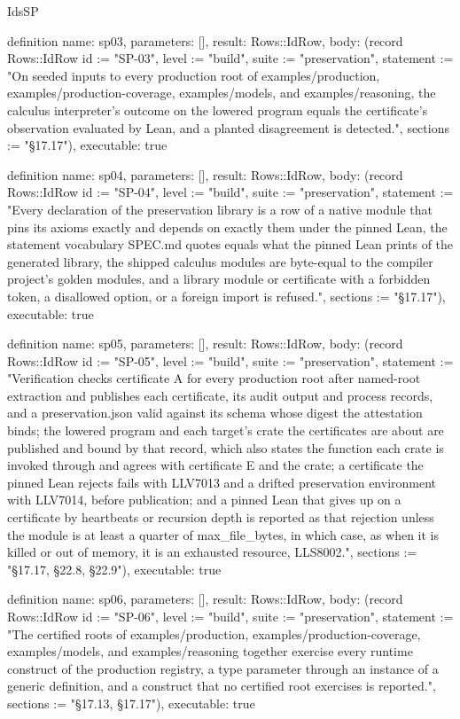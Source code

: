 \begin{lexlean}{IdsSP}
\begin{semanticmodule}
definition{
  name: sp03,
  parameters: [],
  result: Rows::IdRow,
  body: (record Rows::IdRow {id := "SP-03", level := "build", suite := "preservation", statement := "On seeded inputs to every production root of examples/production, examples/production-coverage, examples/models, and examples/reasoning, the calculus interpreter's outcome on the lowered program equals the certificate's observation evaluated by Lean, and a planted disagreement is detected.", sections := "§17.17"}),
  executable: true
}

definition{
  name: sp04,
  parameters: [],
  result: Rows::IdRow,
  body: (record Rows::IdRow {id := "SP-04", level := "build", suite := "preservation", statement := "Every declaration of the preservation library is a row of a native module that pins its axioms exactly and depends on exactly them under the pinned Lean, the statement vocabulary SPEC.md quotes equals what the pinned Lean prints of the generated library, the shipped calculus modules are byte-equal to the compiler project's golden modules, and a library module or certificate with a forbidden token, a disallowed option, or a foreign import is refused.", sections := "§17.17"}),
  executable: true
}

definition{
  name: sp05,
  parameters: [],
  result: Rows::IdRow,
  body: (record Rows::IdRow {id := "SP-05", level := "build", suite := "preservation", statement := "Verification checks certificate A for every production root after named-root extraction and publishes each certificate, its audit output and process records, and a preservation.json valid against its schema whose digest the attestation binds; the lowered program and each target's crate the certificates are about are published and bound by that record, which also states the function each crate is invoked through and agrees with certificate E and the crate; a certificate the pinned Lean rejects fails with LLV7013 and a drifted preservation environment with LLV7014, before publication; and a pinned Lean that gives up on a certificate by heartbeats or recursion depth is reported as that rejection unless the module is at least a quarter of max_file_bytes, in which case, as when it is killed or out of memory, it is an exhausted resource, LLS8002.", sections := "§17.17, §22.8, §22.9"}),
  executable: true
}

definition{
  name: sp06,
  parameters: [],
  result: Rows::IdRow,
  body: (record Rows::IdRow {id := "SP-06", level := "build", suite := "preservation", statement := "The certified roots of examples/production, examples/production-coverage, examples/models, and examples/reasoning together exercise every runtime construct of the production registry, a type parameter through an instance of a generic definition, and a construct that no certified root exercises is reported.", sections := "§17.13, §17.17"}),
  executable: true
}


\end{semanticmodule}
\end{lexlean}
